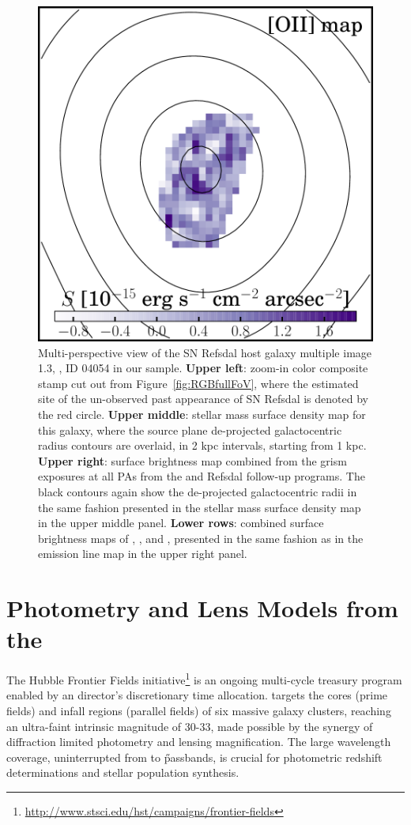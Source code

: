 \begin{figure}
	\includegraphics[width=.33\textwidth]{fig_combELmaps/id04054_OII.pdf}
    \caption[Multi-perspective view of the SN Refsdal host galaxy multiple image 1.3, \ie, ID 04504 in our
    sample.]
    {Multi-perspective view of the SN Refsdal host galaxy multiple image 1.3, \ie, ID
    04054 in our \mg sample.  \textbf{Upper left}: zoom-in color composite stamp cut out from
    Figure~\ref{fig:RGBfullFoV}, where the estimated site of the un-observed past appearance
    of SN Refsdal is denoted by the red circle. \textbf{Upper middle}: stellar mass surface
    density map for this galaxy, where the source plane de-projected galactocentric radius
    contours are overlaid, in 2 kpc intervals, starting from 1 kpc.  \textbf{Upper right}:
    \Ha surface brightness map combined from the \hst grism exposures at all PAs from the
    \glass and Refsdal follow-up programs.
    The black contours again show the de-projected galactocentric radii in the same fashion
    presented in the stellar mass surface density map in the upper middle panel.
    \textbf{Lower rows}: combined surface brightness maps of \OIII, \Hb, and \OII, presented
    in the same fashion as in the \Ha emission line map in the upper right panel.}
    \label{fig:multiP_4054}
\end{figure}


\section{Photometry and Lens Models from the \hff}\label{sect:phot}

The Hubble Frontier Fields
initiative\footnote{\url{http://www.stsci.edu/hst/campaigns/frontier-fields}} \citep[\hff;
P.I.  Lotz,][]{Lotz:2016ca} is an ongoing multi-cycle treasury program enabled by an \hst
director's discretionary time allocation. \hff targets the cores (prime fields) and infall regions (parallel fields)
of six massive galaxy clusters, reaching an ultra-faint intrinsic magnitude of 30-33, made possible by the synergy of diffraction
limited photometry and lensing magnification. The large wavelength coverage, uninterrupted from \B to \H passbands, is crucial for
photometric redshift determinations and stellar population synthesis.

